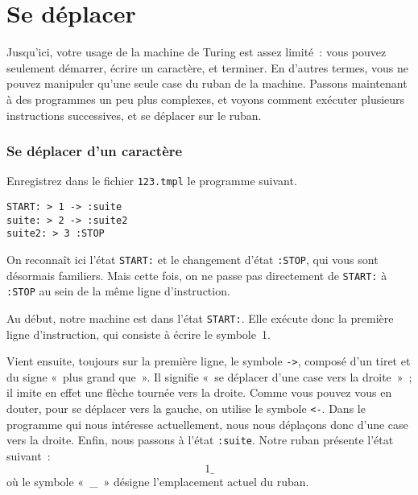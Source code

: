\documentclass[a4paper, 11pt]{report}
\begin{document}
\par


\chapter{Se déplacer}


Jusqu'ici, votre usage de la machine de Turing est assez limité~: vous
pouvez seulement démarrer, écrire un caractère, et terminer. En d'autres
termes, vous ne pouvez manipuler qu'une seule case du ruban de la
machine. Passons maintenant à des programmes un peu plus complexes, et
voyons comment exécuter plusieurs instructions successives, et se
déplacer sur le ruban.

\par


\subsection{Se déplacer d'un caractère}

Enregistrez dans le fichier \texttt{123.tmpl} le programme suivant.

\begin{verbatim}
START: > 1 -> :suite
suite: > 2 -> :suite2
suite2: > 3 :STOP
\end{verbatim}

On reconnaît ici l'état \texttt{START:} et le changement d'état
\texttt{:STOP}, qui vous sont désormais familiers. Mais cette fois, on
ne passe pas directement de \texttt{START:} à \texttt{:STOP} au sein de
la même ligne d'instruction.

\par

Au début, notre machine est dans l'état \texttt{START:}. Elle exécute
donc la première ligne d'instruction, qui consiste à écrire le
symbole~1. 

\par

Vient ensuite, toujours sur la première ligne, le symbole \texttt{->},
composé d'un tiret et du signe «~plus grand que~». Il signifie «~se
déplacer d'une case vers la droite~»~; il imite en effet une flèche
tournée vers la droite. Comme vous pouvez vous en douter, pour se
déplacer vers la gauche, on utilise le symbole \texttt{<-}. Dans le
programme qui nous intéresse actuellement, nous nous déplaçons donc
d'une case vers la droite. Enfin, nous passons à l'état
\texttt{:suite}. Notre ruban présente l'état suivant~: $$1\_$$ où le
symbole «~\_~» désigne l'emplacement actuel du ruban.
\end{document}
